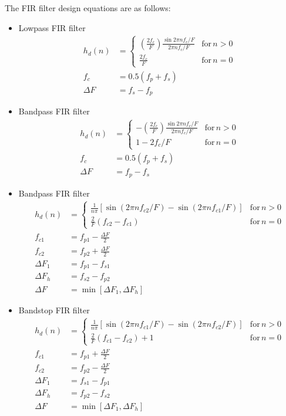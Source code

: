 \documentclass[11pt]{book}
\theoremstyle{example}
\begin{document}
The FIR filter design equations are as follows:
\begin{itemize}
	\item Lowpass FIR filter
		\begin{align}
			h_d(n)&=
			\begin{cases}
				\left(\frac{2f_c}{F}\right)\frac{\sin{2{\pi}nf_c/F}}{2{\pi}nf_c/F} & \mathrm{for}\,n>0\\
				\frac{2f_c}{F} & \mathrm{for}\,n=0
			\end{cases}\\
			f_c&=0.5(f_p+f_s)\\
			{\Delta}F&=f_s-f_p
		\end{align}
	\item Bandpass FIR filter
		\begin{align}
			h_d(n)&=
			\begin{cases}
				-\left(\frac{2f_c}{F}\right)\frac{\sin{2{\pi}nf_c/F}}{2{\pi}nf_c/F} & \mathrm{for}\,n>0\\
				1-2f_c/F & \mathrm{for}\,n=0
			\end{cases}\\
			f_c&=0.5(f_p+f_s)\\
			{\Delta}F&=f_p-f_s
		\end{align}
	\item Bandpass FIR filter
		\begin{align}
			h_d(n)&=
			\begin{cases}
				\frac{1}{n\pi}[\sin{(2{\pi}nf_{c2}/F)}-\sin{(2{\pi}nf_{c1}/F)}] & \mathrm{for}\,n>0\\
				\frac{2}{F}(f_{c2}-f_{c1}) & \mathrm{for}\,n=0
			\end{cases}\\
			f_{c1}&=f_{p1}-\frac{{\Delta}F}{2}\\
			f_{c2}&=f_{p2}+\frac{{\Delta}F}{2}\\
			{\Delta}F_1&=f_{p1}-f_{s1}\\
			{\Delta}F_h&=f_{s2}-f_{p2}\\
			{\Delta}F&=\min{[{\Delta}F_1,{\Delta}F_h]}
		\end{align}
	\item Bandstop FIR filter
		\begin{align}
			h_d(n)&=
			\begin{cases}
				\frac{1}{n\pi}[\sin{(2{\pi}nf_{c1}/F)}-\sin{(2{\pi}nf_{c2}/F)}] & \mathrm{for}\,n>0\\
				\frac{2}{F}(f_{c1}-f_{c2})+1 & \mathrm{for}\,n=0
			\end{cases}\\
			f_{c1}&=f_{p1}+\frac{{\Delta}F}{2}\\
			f_{c2}&=f_{p2}-\frac{{\Delta}F}{2}\\
			{\Delta}F_1&=f_{s1}-f_{p1}\\
			{\Delta}F_h&=f_{p2}-f_{s2}\\
			{\Delta}F&=\min{[{\Delta}F_1,{\Delta}F_h]}
		\end{align}
\end{itemize}
\end{document}
